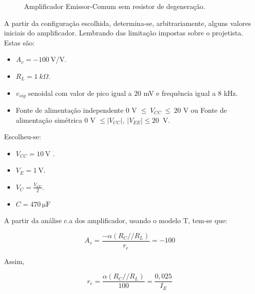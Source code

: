 \documentclass[journal, a4paper]{IEEEtran}
\begin{document}
	\begin{figure}[H]
	
	    \hspace{-0.8 cm}	
    	
    	
	    \caption{Amplificador Emissor-Comum sem resistor de degeneração.}
	    \label{EM sem re}
    \end{figure}
	
    \tab A partir da configuração escolhida, determina-se, arbitrariamente, alguns valores iniciais do amplificador. Lembrando das limitação impostas sobre o projetista. Estas são:
         \begin{itemize}
                \item $A_v = -100 \: $V/V.
                
                \item $R_L = 1 \: k\Omega$.
                
                \item $v_{sig}$ senoidal com valor de pico igual a 20 mV e frequência igual a 8 kHz.
                
                \item  Fonte de alimentação independente $0$ V $\leq \: V_{CC} \: \leq \: 20$ V ou Fonte de alimentação simétrica $0$ V $ \leq |V_{CC}|, \: |V_{EE}| \leq 20 \: $ V.
            \end{itemize}
    \tab Escolheu-se: 
    
         \begin{itemize}
                \item $V_{CC} = 10 \:$V .
                
                \item $V_{E} = 1 \:$V.
                
                \item $V_C = \frac{V_{CC}}{2}$.
                
                \item $C = \SI{470}{\micro\farad}$  
                
            \end{itemize}
       
    \tab A partir da análise c.a dos amplificador, usando o modelo T, tem-se que:
     
       $$     A_v = \frac{-\alpha(R_C//R_L)}{r_e} = -100 $$
      
    \tab Assim, 
     
       $$     r_e = \frac{\alpha(R_C//R_L)}{100} = \frac{0,025}{I_E} $$
      
\end{document}
